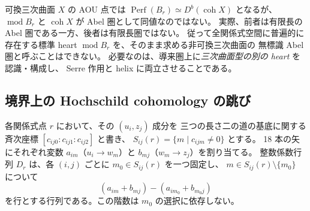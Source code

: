 \begin{remark}
\label{rem:tilting-heart-difference}
可換三次曲面 $X$ の AOU 点では
$\operatorname{Perf}(B_r)\simeq D^b(\operatorname{coh}X)$ となるが、
$\operatorname{mod}B_r$ と $\operatorname{coh}X$ が Abel 圏として同値なのではない。
実際、前者は有限長の Abel 圏である一方、後者は有限長圏ではない。
従って全関係式空間に普遍的に存在する標準 heart
$\operatorname{mod}B_r$ を、そのまま求める非可換三次曲面の
無標識 Abel 圏と呼ぶことはできない。
必要なのは、導来圏上に\emph{三次曲面型の別の heart} を認識・構成し、
Serre 作用と helix に両立させることである。
\end{remark}

\subsection{境界上の Hochschild cohomology の跳び}
各関係式点 $r$ において、その $(u_i,z_j)$ 成分を
三つの長さ二の道の基底に関する斉次座標
$[c_{ij0}:c_{ij1}:c_{ij2}]$ と書き、
$S_{ij}(r)=\{m\mid c_{ijm}\ne0\}$ とする。
18 本の矢にそれぞれ変数 $a_{im}$（$u_i\to w_m$）と
$b_{mj}$（$w_m\to z_j$）を割り当てる。
整数係数行列 $D_r$ は、各 $(i,j)$ ごとに $m_0\in S_{ij}(r)$ を一つ固定し、
$m\in S_{ij}(r)\setminus\{m_0\}$ について
\[
 (a_{im}+b_{mj})-(a_{im_0}+b_{m_0j})
\]
を行とする行列である。この階数は $m_0$ の選択に依存しない。

